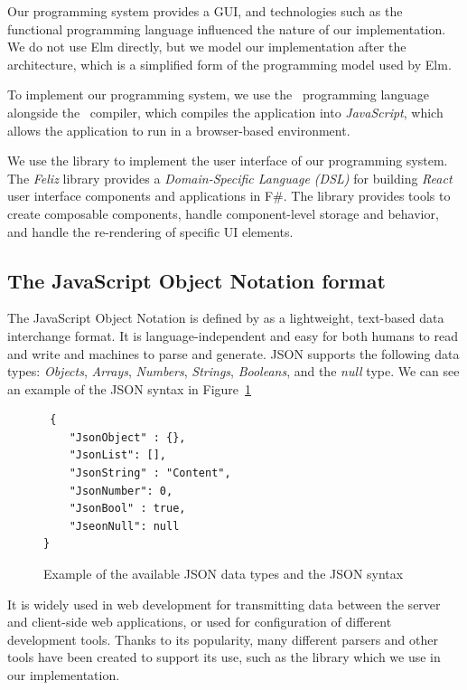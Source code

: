Our programming system provides a GUI, and technologies such as the~\citet{eml} functional programming language influenced the nature of our implementation.
We do not use Elm directly, but we model our implementation after the~\citet{elmish} architecture, which is a simplified form of the programming model used by Elm.

To implement our programming system, we use the~\citet{fsharp} programming language alongside the~\citet{fable} compiler, which compiles the application into \emph{JavaScript},
which allows the application to run in a browser-based environment.

We use the \citet{feliz} library to implement the user interface of our programming system.
The \emph{Feliz} library provides a \emph{Domain-Specific Language (DSL)} for building \emph{React} user interface components and applications in F\#.
The \citet{react} library provides tools to create composable components, handle component-level storage and behavior, and handle the re-rendering of specific UI elements.

\subsection{The JavaScript Object Notation format}
The JavaScript Object Notation is defined by \citet{rfc8259} as a lightweight, text-based data interchange format.
It is language-independent and easy for both humans to read and write and machines to parse and generate.
JSON supports the following data types: \emph{Objects}, \emph{Arrays}, \emph{Numbers}, \emph{Strings}, \emph{Booleans}, and the \emph{null} type.
We can see an example of the JSON syntax in Figure~\ref{fig:json-example}

\begin{figure}[htbp]
	\caption {Example of the available JSON data types and the JSON syntax}
	\label{fig:json-example}
	\begin{lstlisting}
 { 
    "JsonObject" : {},
    "JsonList": [],
    "JsonString" : "Content",
    "JsonNumber": 0,
    "JsonBool" : true,
    "JseonNull": null
}
  \end{lstlisting}
\end{figure}

It is widely used in web development for transmitting data between the server and client-side web applications,
or used for configuration of different development tools.
Thanks to its popularity, many different parsers and other tools have been created to support its use, such as the \citet{simpleJson} library which we use in our implementation.

